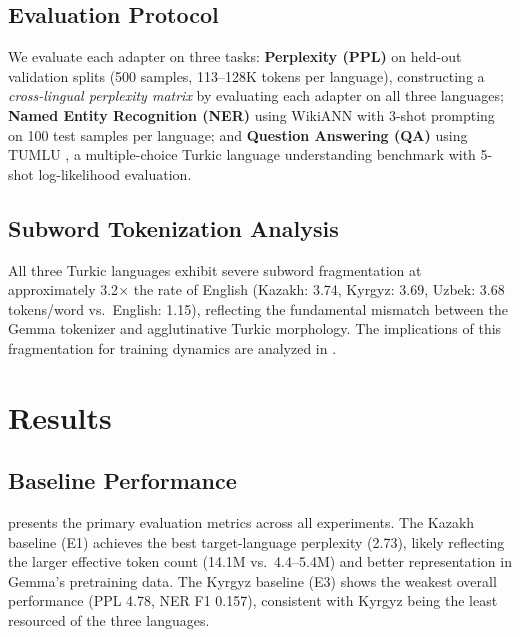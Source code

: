 \documentclass[11pt]{article}
\begin{document}
\subsection{Evaluation Protocol}

We evaluate each adapter on three tasks: \textbf{Perplexity (PPL)} on held-out validation splits (500 samples, 113--128K tokens per language), constructing a \emph{cross-lingual perplexity matrix} by evaluating each adapter on all three languages; \textbf{Named Entity Recognition (NER)} using WikiANN \cite{pan2017cross} with 3-shot prompting on 100 test samples per language; and \textbf{Question Answering (QA)} using TUMLU \cite{isbarov2024tumlu}, a multiple-choice Turkic language understanding benchmark with 5-shot log-likelihood evaluation.

\subsection{Subword Tokenization Analysis}
\label{sec:tokenization}

All three Turkic languages exhibit severe subword fragmentation at approximately 3.2$\times$ the rate of English (Kazakh: 3.74, Kyrgyz: 3.69, Uzbek: 3.68 tokens/word vs.\ English: 1.15), reflecting the fundamental mismatch between the Gemma tokenizer and agglutinative Turkic morphology. The implications of this fragmentation for training dynamics are analyzed in .

\section{Results}

\subsection{Baseline Performance}

 presents the primary evaluation metrics across all experiments. The Kazakh baseline (E1) achieves the best target-language perplexity (2.73), likely reflecting the larger effective token count (14.1M vs.\ 4.4--5.4M) and better representation in Gemma's pretraining data. The Kyrgyz baseline (E3) shows the weakest overall performance (PPL 4.78, NER F1 0.157), consistent with Kyrgyz being the least resourced of the three languages.
\end{document}
